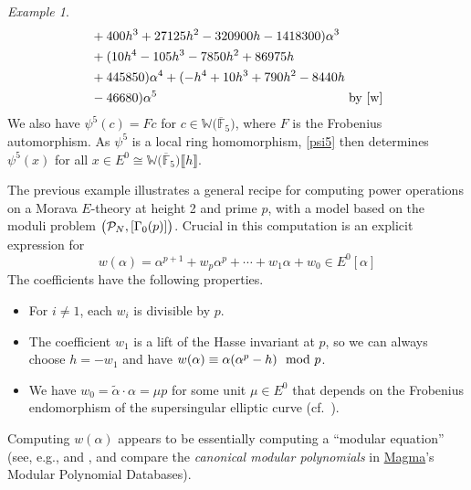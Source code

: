 \documentclass{gtpart}
\theoremstyle{definition}
\theoremstyle{remark}
\newtheorem{ex}[equation]{Example}
\newcommand{\mb}[1]{\mathbb{#1}}
\newcommand{\cF}{\overline {\mb F}}
\newcommand{\CP}{{\cal P}}
\newcommand{\BW}{{\mb W}}
\newcommand{\md}{~~{\rm mod}~}
\newcommand{\A}{\alpha}
\newcommand{\G}{\Gamma}
\newcommand{\lb}{\llbracket}
\newcommand{\rb}{\rrbracket}
\renewcommand{\=}{\approx}
\renewcommand{\-}{\sim}
\numberwithin{equation}{section}
\begin{document}
\begin{ex}
\begin{equation}
\begin{split}
               & + 400 h^3 + 27125 h^2 - 320900 h - 1418300) \A^3 \\
               & + (10 h^4 - 105 h^3 - 7850 h^2 + 86975 h \\
               & + 445850) \A^4 + (-h^4 + 10 h^3 + 790 h^2 - 8440 h \\
               & - 46680) \A^5 
                 \qquad\qquad\qquad\qquad\qquad\qquad\qquad~~~ 
                 \text{by \eqref{w}} 
  \end{split}
 \end{equation}
 We also have $\psi^5(c) = F c$ for $c \in \BW \big( \cF_5 \big)$, where $F$ is 
 the Frobenius automorphism.  As $\psi^5$ is a local ring homomorphism, 
 \eqref{psi5} then determines $\psi^5(x)$ for all 
 $x \in E^0 \cong \BW \big( \cF_5 \big) \lb h \rb$.  
\end{ex}

The previous example illustrates a general recipe for computing power operations 
on a Morava $E$-theory at height 2 and prime $p$, with a model based on the 
moduli problem $\big(\CP_N,[\G_0(p)]\big)$.  Crucial in this computation is an 
explicit expression for 
\begin{equation}
 \label{generalw}
 w(\A) = \A^{p + 1} + w_p \A^p + \cdots + w_1 \A + w_0 \in E^0[\A] 
\end{equation}
The coefficients have the following properties.  
\begin{itemize}
 \item For $i \neq 1$, each $w_i$ is divisible by $p$.  

 \item The coefficient $w_1$ is a lift of the Hasse invariant at $p$, so we can 
 always choose $h = -w_1$ and have $w(\A) \equiv \A (\A^p - h) \md p$.  

 \item We have $w_0 = \widetilde{\A} \cdot \A = \mu p$ for some unit 
 $\mu \in E^0$ that depends on the Frobenius endomorphism of the supersingular 
 elliptic curve (cf.~\cite[3.8]{mc1}).  
\end{itemize}
Computing $w(\A)$ appears to be essentially computing a ``modular equation'' 
(see, e.g., \cite[II.6]{Milne} and \cite{MO}, and compare the {\em canonical 
modular polynomials} in 
\href{http://magma.maths.usyd.edu.au/magma/handbook}{Magma}'s Modular Polynomial 
Databases).  
\end{document}
